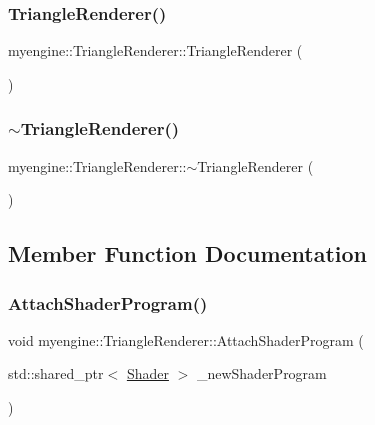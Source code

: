 \subsubsection{\texorpdfstring{Triangle\+Renderer()}{TriangleRenderer()}}
{\footnotesize\ttfamily myengine\+::\+Triangle\+Renderer\+::\+Triangle\+Renderer (\begin{DoxyParamCaption}{ }\end{DoxyParamCaption})}

\mbox{\label{classmyengine_1_1_triangle_renderer_a5802b748911e8f3a4a4bbc2411c98ef7}} 
\subsubsection{\texorpdfstring{$\sim$\+Triangle\+Renderer()}{~TriangleRenderer()}}
{\footnotesize\ttfamily myengine\+::\+Triangle\+Renderer\+::$\sim$\+Triangle\+Renderer (\begin{DoxyParamCaption}{ }\end{DoxyParamCaption})}



\subsection{Member Function Documentation}
\mbox{\label{classmyengine_1_1_triangle_renderer_ae19ddcd41f6950a92744de0a17c43dbf}} 
\subsubsection{\texorpdfstring{Attach\+Shader\+Program()}{AttachShaderProgram()}}
{\footnotesize\ttfamily void myengine\+::\+Triangle\+Renderer\+::\+Attach\+Shader\+Program (\begin{DoxyParamCaption}\item[{std\+::shared\+\_\+ptr$<$ \hyperlink{classmyengine_1_1_shader}{Shader} $>$}]{\+\_\+new\+Shader\+Program }\end{DoxyParamCaption})}


